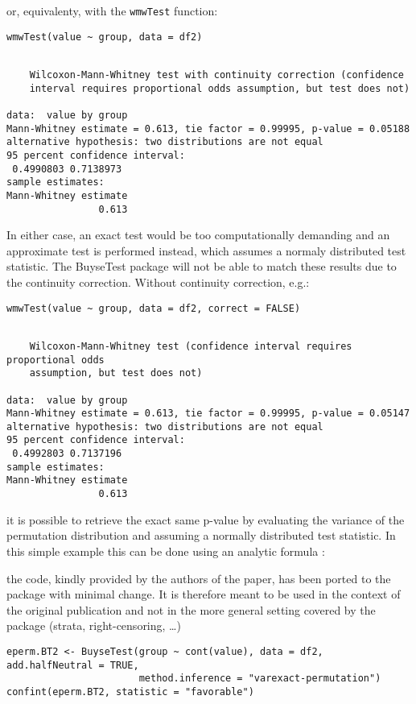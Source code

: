 \documentclass[12pt]{article}
\newcommand\Warning[1][3ex]{%
\renewcommand\stacktype{L}%
\scaleto{\stackon[1.3pt]{\color{red}$\triangle$}{\tiny\bfseries !}}{#1}%
\xspace
}
\begin{document}
or, equivalenty, with the \texttt{wmwTest} function:
\lstset{language=r,label= ,caption= ,captionpos=b,numbers=none}
\begin{lstlisting}
wmwTest(value ~ group, data = df2)
\end{lstlisting}

\begin{verbatim}

	Wilcoxon-Mann-Whitney test with continuity correction (confidence
	interval requires proportional odds assumption, but test does not)

data:  value by group
Mann-Whitney estimate = 0.613, tie factor = 0.99995, p-value = 0.05188
alternative hypothesis: two distributions are not equal
95 percent confidence interval:
 0.4990803 0.7138973
sample estimates:
Mann-Whitney estimate 
                0.613
\end{verbatim}

In either case, an exact test would be too computationally demanding
and an approximate test is performed instead, which assumes a normaly
distributed test statistic. The BuyseTest package will not be able to
match these results due to the continuity correction. Without
continuity correction, e.g.:
\lstset{language=r,label= ,caption= ,captionpos=b,numbers=none}
\begin{lstlisting}
wmwTest(value ~ group, data = df2, correct = FALSE)
\end{lstlisting}

\begin{verbatim}

	Wilcoxon-Mann-Whitney test (confidence interval requires proportional odds
	assumption, but test does not)

data:  value by group
Mann-Whitney estimate = 0.613, tie factor = 0.99995, p-value = 0.05147
alternative hypothesis: two distributions are not equal
95 percent confidence interval:
 0.4992803 0.7137196
sample estimates:
Mann-Whitney estimate 
                0.613
\end{verbatim}

\noindent it is possible to retrieve the exact same p-value by
evaluating the variance of the permutation distribution and assuming a
normally distributed test statistic. In this simple example this can
be done using an analytic formula \citep{anderson2023exact}: \newline
\Warning the code, kindly provided by the authors of the paper, has
been ported to the package with minimal change. It is therefore meant
to be used in the context of the original publication and not in the
more general setting covered by the package (strata, right-censoring,
\ldots)
\lstset{language=r,label= ,caption= ,captionpos=b,numbers=none}
\begin{lstlisting}
eperm.BT2 <- BuyseTest(group ~ cont(value), data = df2, add.halfNeutral = TRUE,
                       method.inference = "varexact-permutation")
confint(eperm.BT2, statistic = "favorable")
\end{lstlisting}
\end{document}

